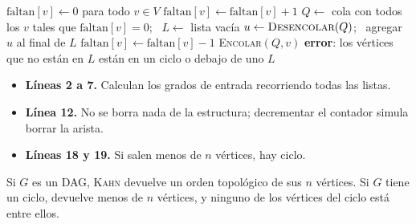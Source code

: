 \documentclass[11pt,letterpaper]{article}
\begin{document}
\begin{algorithm}[H]
\caption{\textsc{Kahn}$(G)$, orden topológico por grados de entrada}
\label{alg:kahn}
\begin{algorithmic}[1]
  \State $\text{faltan}[v] \gets 0$ para todo $v \in V$
      \State $\text{faltan}[v] \gets \text{faltan}[v] + 1$
    \EndFor
  \EndFor
  \State $Q \gets$ cola con todos los $v$ tales que
         $\text{faltan}[v] = 0$; \ $L \gets$ lista vacía
    \State $u \gets \textsc{Desencolar}(Q)$; \ agregar $u$ al final
           de $L$
      \State $\text{faltan}[v] \gets \text{faltan}[v] - 1$
        \State \textsc{Encolar}$(Q, v)$
      \EndIf
    \EndFor
  \EndWhile
    \State \textbf{error}: los vértices que no están en $L$ están en un
           ciclo o debajo de uno
  \EndIf
  \State \Return $L$
\EndProcedure
\end{algorithmic}
\end{algorithm}

\begin{itemize}[itemsep=0.1em]
  \item \textbf{Líneas 2 a 7.} Calculan los grados de entrada
        recorriendo todas las listas.
  \item \textbf{Línea 12.} No se borra nada de la estructura;
        decrementar el contador simula borrar la arista.
  \item \textbf{Líneas 18 y 19.} Si salen menos de $n$ vértices, hay
        ciclo.
\end{itemize}

\begin{proposicion}
  \label{prop:kahn-correcto}
  Si $G$ es un DAG, {\upshape\textsc{Kahn}} devuelve un orden
  topológico de sus $n$ vértices. Si $G$ tiene un ciclo, devuelve
  menos de $n$ vértices, y ninguno de los vértices del ciclo está entre
  ellos.
\end{proposicion}
\end{document}
